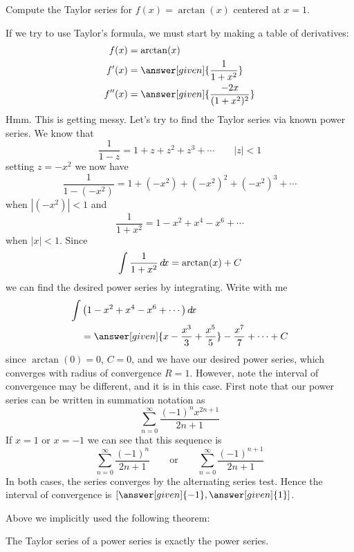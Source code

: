 \documentclass{ximera}
\begin{document}
\begin{example}
  Compute the Taylor series for $f(x) = \arctan(x)$ centered at $x=1$.
  \begin{explanation}
    If we try to use Taylor's formula, we must start by making a table
    of derivatives:
    \begin{align*}
      f(x) &= \arctan(x)\\
      f'(x) &= \answer[given]{\frac{1}{1+x^2}}\\
      f''(x) &= \answer[given]{\frac{-2x}{(1+x^2)^2}}
    \end{align*}
    Hmm. This is getting messy. Let's try to find the Taylor series
    via known power series. We know that
    \[
    \frac{1}{1-z} = 1+ z+ z^2 + z^3 + \cdots \qquad |z|< 1
    \]
    setting $z = -x^2$ we now have
    \[
    \frac{1}{1-(-x^2)} = 1 + (-x^2)+ (-x^2)^2 + (-x^2)^3 + \cdots
    \]
    when $|(-x^2)|< 1$ and
    \[
    \frac{1}{1+x^2} = 1 - x^2 + x^4 - x^6 + \cdots 
    \]
    when $|x|< 1$. Since
    \[
    \int\frac{1}{1+x^2} \mathop{}\!d\! x = \arctan(x) + C
    \]
    we can find the desired power series by integrating. Write with me
    \begin{align*}
      \int &\left(1 - x^2 + x^4 - x^6 + \cdots\right)\d x \\
      &= \answer[given]{x - \frac{x^3}{3} + \frac{x^5}{5}} - \frac{x^7}{7} + \cdots +C
    \end{align*}
    since $\arctan(0) = 0$, $C=0$, and we have our desired power
    series, which converges with radius of convergence $R=1$. However,
    note the interval of convergence may be different, and it is in
    this case. First note that our power series can be written in summation notation as
    \[
    \sum_{n=0}^\infty \frac{(-1)^n x^{2n+1}}{2n+1}
    \]
    If $x=1$ or $x=-1$ we can see that this sequence is
    \[
    \sum_{n=0}^\infty \frac{(-1)^n}{2n+1}\qquad\text{or}\qquad\sum_{n=0}^\infty \frac{(-1)^{n+1}}{2n+1}
    \]
    In both cases, the series converges by the alternating series
    test. Hence the interval of convergence is $[\answer[given]{-1},\answer[given]{1}]$.
  \end{explanation}
\end{example}

Above we implicitly used the following theorem:


\begin{theorem}
  The Taylor series of a power series is exactly the power series.
\end{theorem}
\end{document}
